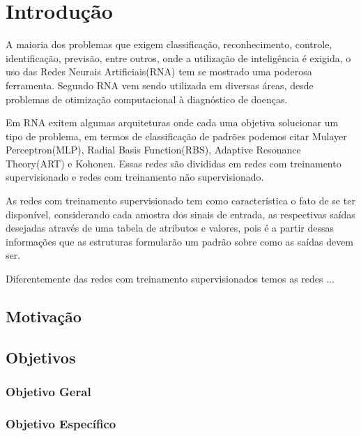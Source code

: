 \chapter{Introdução}
\label{cap:introducao}
A maioria dos problemas que exigem classificação, reconhecimento, controle, identificação, previsão, entre outros, onde a utilização de inteligência é exigida, o uso das Redes Neurais Artificiais(RNA) tem se mostrado uma poderosa ferramenta. Segundo  RNA vem sendo utilizada em diversas áreas, desde problemas de otimização computacional à diagnóstico de doenças. 

Em RNA exitem algumas arquiteturas onde cada uma objetiva solucionar um tipo de problema, em termos de classificação de padrões podemos citar Mulayer Perceptron(MLP), Radial Basis Function(RBS), Adaptive Resonance Theory(ART) e Kohonen. Essas redes são divididas em redes com treinamento supervisionado e redes com treinamento não supervisionado.

 As redes com treinamento supervisionado tem como característica o fato de se ter disponível, considerando cada amostra dos sinais de entrada, as respectivas saídas desejadas através de uma tabela de atributos e valores, pois é a partir dessas informações que as estruturas formularão um padrão sobre como as saídas devem ser.
 
 Diferentemente das redes com treinamento supervisionados temos as redes ...




\section{Motivação}
\label{sec:motivacao}


\section{Objetivos}
\label{sec:objetivos}

\subsection{Objetivo Geral}
\label{sec:objetivo-geral}

\subsection{Objetivo Específico}
\label{sec:objetivo-específico}

